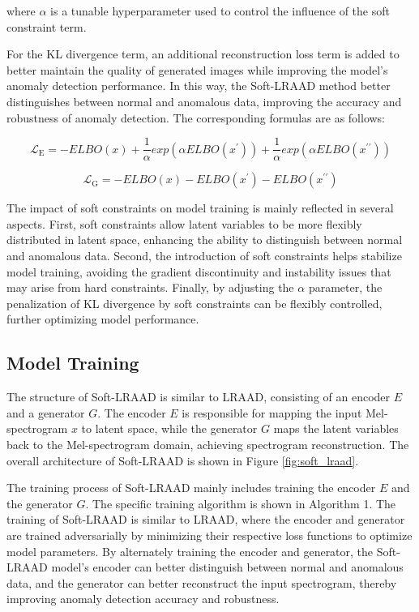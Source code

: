 \documentclass{article}
\begin{document}
where $\alpha$ is a tunable hyperparameter used to control the influence of the soft constraint term.

For the KL divergence term, an additional reconstruction loss term is added to better maintain the quality of generated images while improving the model's anomaly detection performance. In this way, the Soft-LRAAD method better distinguishes between normal and anomalous data, improving the accuracy and robustness of anomaly detection. The corresponding formulas are as follows:

\begin{equation} \label{eq:encoder_loss}
  \mathcal{L}_{\mathrm{E}}=-ELBO(x) + \frac{1}{\alpha}exp(\alpha ELBO(x^\prime)) + \frac{1}{\alpha}exp(\alpha ELBO(x^{\prime\prime}))
\end{equation}

\begin{equation} \label{eq:decoder_loss}
  \mathcal{L}_{\text {G}}=-ELBO(x) - ELBO(x^\prime) - ELBO(x^{\prime\prime})
\end{equation}

The impact of soft constraints on model training is mainly reflected in several aspects. First, soft constraints allow latent variables to be more flexibly distributed in latent space, enhancing the ability to distinguish between normal and anomalous data. Second, the introduction of soft constraints helps stabilize model training, avoiding the gradient discontinuity and instability issues that may arise from hard constraints. Finally, by adjusting the $\alpha$ parameter, the penalization of KL divergence by soft constraints can be flexibly controlled, further optimizing model performance.

\subsection{Model Training}

The structure of Soft-LRAAD is similar to LRAAD, consisting of an encoder $E$ and a generator $G$. The encoder $E$ is responsible for mapping the input Mel-spectrogram $x$ to latent space, while the generator $G$ maps the latent variables back to the Mel-spectrogram domain, achieving spectrogram reconstruction. The overall architecture of Soft-LRAAD is shown in Figure \ref{fig:soft_lraad}.

The training process of Soft-LRAAD mainly includes training the encoder $E$ and the generator $G$. The specific training algorithm is shown in Algorithm 1. The training of Soft-LRAAD is similar to LRAAD, where the encoder and generator are trained adversarially by minimizing their respective loss functions to optimize model parameters. By alternately training the encoder and generator, the Soft-LRAAD model's encoder can better distinguish between normal and anomalous data, and the generator can better reconstruct the input spectrogram, thereby improving anomaly detection accuracy and robustness.
\end{document}
